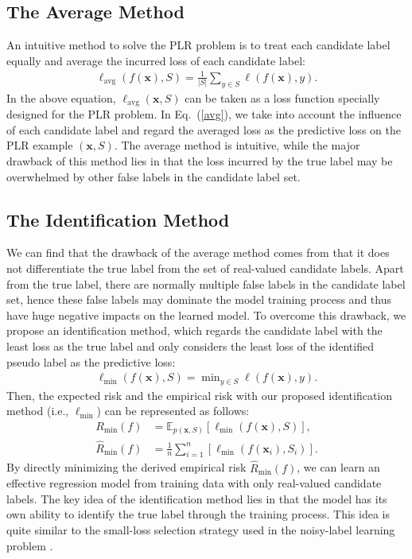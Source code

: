 \documentclass[letterpaper]{article} %
\begin{document}
\subsection{The Average Method}
An intuitive method to solve the PLR problem is to treat each candidate label equally and average the incurred loss of each candidate label:
\begin{gather}
\label{avg}
\ell_{\mathrm{avg}}(f(\bm{x}), S) = \frac{1}{|S|}\sum\nolimits_{y\in S}\ell(f(\bm{x}), y).
\end{gather}
In the above equation, $\ell_{\mathrm{avg}}(\bm{x}, S)$ can be taken as a loss function specially designed for the PLR problem. In Eq.~(\ref{avg}), we take into account the influence of each candidate label and regard the averaged loss as the predictive loss on the PLR example $(\bm{x},S)$. The average method is intuitive, while the major drawback of this method lies in that the loss incurred by the true label may be overwhelmed by other false labels in the candidate label set.

\subsection{The Identification Method}
We can find that the drawback of the average method comes from that it does not differentiate the true label from the set of real-valued candidate labels. Apart from the true label, there are normally multiple false labels in the candidate label set, hence these false labels may dominate the model training process and thus have huge negative impacts on the learned model. To overcome this drawback, we propose an identification method, which regards the candidate label with the least loss as the true label and only considers the least loss of the identified pseudo label as the predictive loss:
\begin{gather}
\label{idt}
\ell_{\mathrm{min}}(f(\bm{x}), S)=\min\nolimits_{y\in S}\ell(f(\bm{x}), y).
\end{gather}
Then, the expected risk and the empirical risk with our proposed identification method (i.e., $\ell_{\mathrm{min}}$) can be represented as follows:
\begin{align}
\nonumber
R_{\mathrm{min}}(f)&=\mathbb{E}_{p(\bm{x}, S)}[\ell_{\mathrm{min}}(f(\bm{x}),S)],\\
\label{min_empirical_risk}
\widehat{R}_{\mathrm{min}}(f)&=\frac{1}{n}\sum\nolimits_{i=1}^n[\ell_{\mathrm{min}}(f(\bm{x}_i),S_i)].
\end{align}
By directly minimizing the derived empirical risk $\widehat{R}_{\mathrm{min}}(f)$, we can learn an effective regression model from training data with only real-valued candidate labels. The key idea of the identification method lies in that the model has its own ability to identify the true label through the training process. This idea is quite similar to the small-loss selection strategy used in the noisy-label learning problem \cite{han2018co,wei2020combating}.
\end{document}
